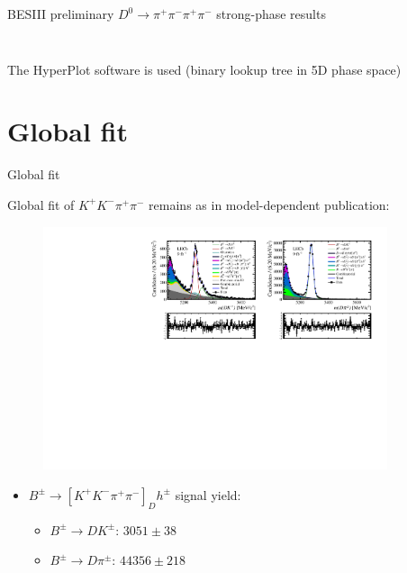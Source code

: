 \documentclass[xcolor={dvipsnames}]{beamer}
\begin{document}
\begin{frame}{BESIII preliminary $D^0\to\pi^+\pi^-\pi^+\pi^-$ strong-phase results}
\begin{columns}
\begin{column}{0.50\textwidth}
\begin{figure}
      \end{figure}
    \end{column}
  \end{columns}
  \begin{center}
    The HyperPlot software is used (binary lookup tree in 5D phase space)
  \end{center}
\end{frame}

\section{Global fit}
\begin{frame}{Global fit}
  \begin{center}
    {\large Global fit of $K^+K^-\pi^+\pi^-$ remains as in model-dependent publication:}
  \end{center}
  \begin{figure}
    \centering
    \includegraphics[width = 0.9\textwidth,trim={0 0 0 0},clip=true]{Plots/d2kkpipi_fiveL_allDP.pdf}
  \end{figure}
  \vspace{-0.5cm}
  \begin{itemize}
    \item{$B^\pm\to[K^+K^-\pi^+\pi^-]_Dh^\pm$ signal yield:}
    \begin{itemize}
      \item{$B^\pm\to DK^\pm$: $3051 \pm 38$}
      \item{$B^\pm\to D\pi^\pm$: $44356 \pm 218$}
    \end{itemize}
  \end{itemize}
\end{frame}
\end{document}
